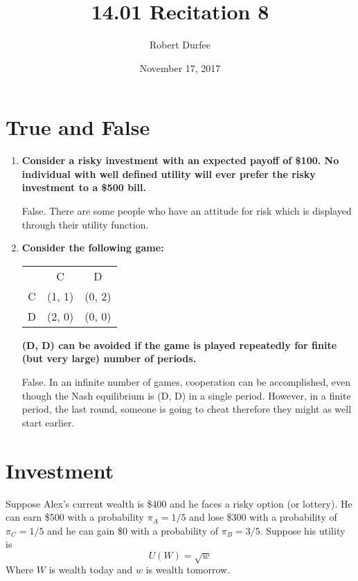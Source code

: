 \documentclass{article}
\title{ 14.01 Recitation 8 }
\author{ Robert Durfee }
\date{ November 17, 2017 }
\begin{document}
\maketitle

\section{ True and False}

\begin{enumerate}
    \item \textbf{Consider a risky investment with an expected payoff of \$100.
        No individual with well defined utility will ever prefer the risky
        investment to a \$500 bill.}

        False. There are some people who have an attitude for risk which is
        displayed through their utility function.

    \item \textbf{Consider the following game:}
        \begin{center}
            \begin{tabular}{c c c}
                & C & D \\
                C & (1, 1) & (0, 2) \\
                D & (2, 0) & (0, 0)
            \end{tabular}
        \end{center}
        \textbf{(D, D) can be avoided if the game is played repeatedly for
        finite (but very large) number of periods.}

        False. In an infinite number of games, cooperation can be accomplished,
        even though the Nash equilibrium is (D, D) in a single period. However,
        in a finite period, the last round, someone is going to cheat therefore
        they might as well start earlier.

\end{enumerate}

\section{Investment}

Suppose Alex's current wealth is \$400 and he faces a risky option (or
lottery). He can earn \$500 with a probability $\pi_A = 1 / 5$ and lose \$300
with a probability of $\pi_C = 1 / 5$ and he can gain \$0 with a probability of
$\pi_B = 3 / 5$. Suppose his utility is 
$$U(W)=\sqrt{w}$$
Where $W$ is wealth today and $w$ is wealth tomorrow.
\end{document}
